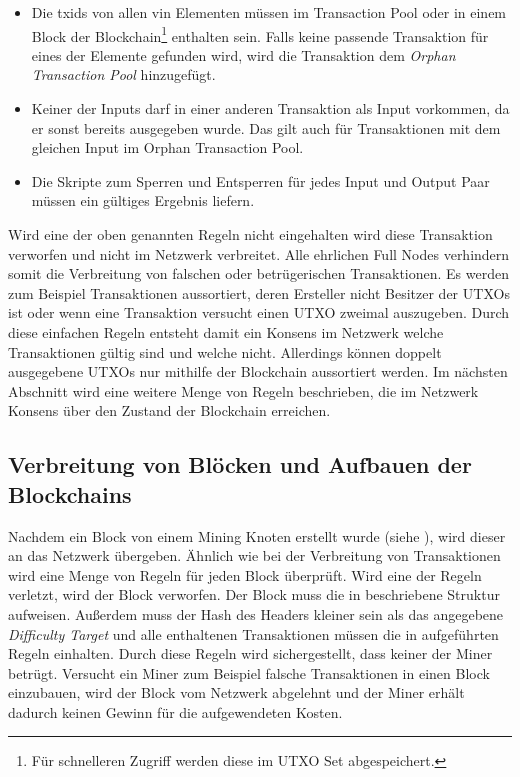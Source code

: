 \documentclass[ngerman,runningheads,a4paper]{llncs}[2018/03/10]
\begin{document}
\begin{itemize}

\item Die txids von allen vin Elementen müssen im Transaction Pool oder in einem Block der Blockchain\footnote{Für schnelleren Zugriff werden diese im UTXO Set abgespeichert.} enthalten sein. Falls keine passende Transaktion für eines der Elemente gefunden wird, wird die Transaktion dem \textit{Orphan Transaction Pool} hinzugefügt.

\item Keiner der Inputs darf in einer anderen Transaktion als Input vorkommen, da er sonst bereits ausgegeben wurde. Das gilt auch für Transaktionen mit dem gleichen Input im Orphan Transaction Pool.

\item Die Skripte zum Sperren und Entsperren für jedes Input und Output Paar müssen ein gültiges Ergebnis liefern.

\end{itemize}

Wird eine der oben genannten Regeln nicht eingehalten wird diese Transaktion verworfen und nicht im Netzwerk verbreitet. Alle ehrlichen Full Nodes verhindern somit die Verbreitung von falschen oder betrügerischen Transaktionen. Es werden zum Beispiel Transaktionen aussortiert, deren Ersteller nicht Besitzer der UTXOs ist oder wenn eine Transaktion versucht einen UTXO zweimal auszugeben. Durch diese einfachen Regeln entsteht damit ein Konsens im Netzwerk welche Transaktionen gültig sind und welche nicht. Allerdings können doppelt ausgegebene UTXOs nur mithilfe der Blockchain aussortiert werden. Im nächsten Abschnitt wird eine weitere Menge von Regeln beschrieben, die im Netzwerk Konsens über den Zustand der Blockchain erreichen.

\subsection{Verbreitung von Blöcken und Aufbauen der Blockchains}\label{sec:blockverbreitung}

Nachdem ein Block von einem Mining Knoten erstellt wurde (siehe ), wird dieser an das Netzwerk übergeben. Ähnlich wie bei der Verbreitung von Transaktionen wird eine Menge von Regeln für jeden Block überprüft. Wird eine der Regeln verletzt, wird der Block verworfen. Der Block muss die in  beschriebene Struktur aufweisen. Außerdem muss der Hash des Headers kleiner sein als das angegebene \textit{Difficulty Target} und alle enthaltenen Transaktionen müssen die in  aufgeführten Regeln einhalten. Durch diese Regeln wird sichergestellt, dass keiner der Miner betrügt. Versucht ein Miner zum Beispiel falsche Transaktionen in einen Block einzubauen, wird der Block vom Netzwerk abgelehnt und der Miner erhält dadurch keinen Gewinn für die aufgewendeten Kosten.
\end{document}
